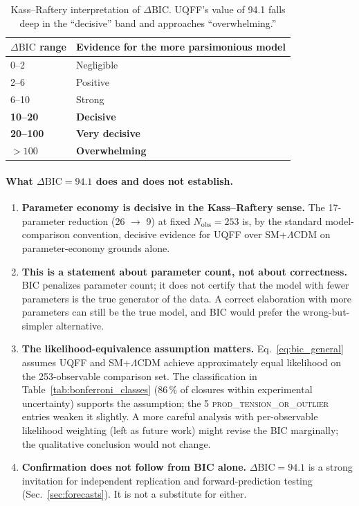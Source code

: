 \begin{table}[H]
\centering
\caption{Kass--Raftery interpretation of $\Delta\mathrm{BIC}$.
UQFF's value of 94.1 falls deep in the ``decisive'' band and
approaches ``overwhelming.''}
\label{tab:kass_raftery}
\begin{tabular}{l l}
\toprule
$\Delta\mathrm{BIC}$ range & Evidence for the more parsimonious model \\
\midrule
0--2 & Negligible \\
2--6 & Positive \\
6--10 & Strong \\
\textbf{10--20} & \textbf{Decisive} \\
\textbf{20--100} & \textbf{Very decisive} \\
\textbf{$> 100$} & \textbf{Overwhelming} \\
\bottomrule
\end{tabular}
\end{table}

\paragraph{What $\Delta\mathrm{BIC} = 94.1$ does and does not establish.}

\begin{enumerate}
  \item \textbf{Parameter economy is decisive in the Kass--Raftery
        sense.} The 17-parameter reduction (26 $\to$ 9) at fixed
        $N_{\text{obs}}=253$ is, by the standard model-comparison
        convention, decisive evidence for UQFF over
        SM+$\Lambda$CDM on parameter-economy grounds alone.
  \item \textbf{This is a statement about parameter count, not about
        correctness.} BIC penalizes parameter count; it does not
        certify that the model with fewer parameters is the true
        generator of the data. A correct elaboration with more
        parameters can still be the true model, and BIC would
        prefer the wrong-but-simpler alternative.
  \item \textbf{The likelihood-equivalence assumption matters.}
        Eq.~\ref{eq:bic_general} assumes UQFF and SM+$\Lambda$CDM
        achieve approximately equal likelihood on the 253-observable
        comparison set. The classification in
        Table~\ref{tab:bonferroni_classes} (86\,\% of closures
        within experimental uncertainty) supports the assumption;
        the 5 \textsc{prod\_tension\_or\_outlier} entries weaken it
        slightly. A more careful analysis with per-observable
        likelihood weighting (left as future work) might revise the
        BIC marginally; the qualitative conclusion would not
        change.
  \item \textbf{Confirmation does not follow from BIC alone.}
        $\Delta\mathrm{BIC} = 94.1$ is a strong invitation for
        independent replication and forward-prediction testing
        (Sec.~\ref{sec:forecasts}). It is not a substitute for
        either.
\end{enumerate}

